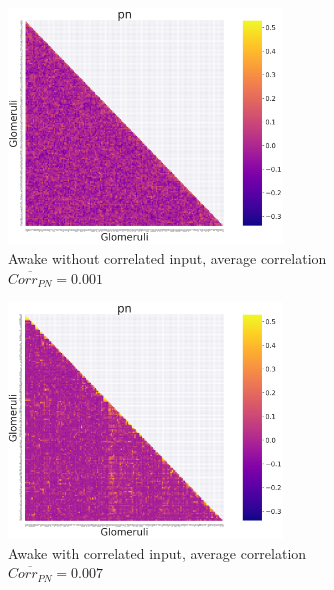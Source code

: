 \begin{figure}
  \centering
  \begin{subfigure}[t]{0.45\textwidth}
    \centering
    \includegraphics[width=0.8\textwidth]{correlation-awake-no-poisson-pn}
    \caption{Awake without correlated input, average correlation $\overline{Corr_{PN}} = 0.001$}
    \label{fig:awake_state}
  \end{subfigure}
  \begin{subfigure}[t]{0.45\textwidth}
    \centering
    \includegraphics[width=0.8\textwidth]{correlation-awake-poisson-pn}
    \caption{Awake with correlated input, average correlation $\overline{Corr_{PN}} = 0.007$}
    \label{fig:awake_state_with_poisson}
  \end{subfigure}
  \begin{subfigure}[t]{0.45\textwidth}
    \centering

\end{subfigure}
\end{figure}
